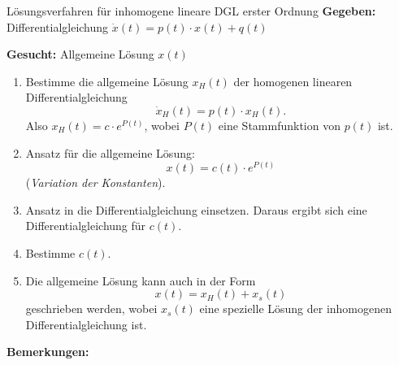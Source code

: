 \begin{satz}{Lösungsverfahren für inhomogene lineare DGL erster Ordnung}{}
    \textbf{Gegeben:} Differentialgleichung
    \(\dot{x}(t)=p(t)\cdot x(t)+q(t)\)

    \textbf{Gesucht:} Allgemeine Lösung \(x(t)\)

    \begin{enumerate}
        \item Bestimme die allgemeine Lösung \(x_H(t)\) der
              homogenen linearen Differentialgleichung
              \[
                  \dot{x}_H(t)=p(t)\cdot x_H(t).
              \]
              Also \(x_H(t)=c\cdot e^{P(t)}\), wobei
              \(P(t)\) eine Stammfunktion von \(p(t)\) ist.

        \item Ansatz für die allgemeine Lösung:
              \[
                  x(t)=c(t)\cdot e^{P(t)}
              \]
              (\emph{Variation der Konstanten}).

        \item Ansatz in die Differentialgleichung einsetzen.
              Daraus ergibt sich eine Differentialgleichung
              für \(c(t)\).

        \item Bestimme \(c(t)\).

        \item Die allgemeine Lösung kann auch in der Form
              \[
                  x(t)=x_H(t)+x_s(t)
              \]
              geschrieben werden, wobei \(x_s(t)\)
              eine spezielle Lösung der inhomogenen
              Differentialgleichung ist.
    \end{enumerate}
\end{satz}

\textbf{Bemerkungen:}


